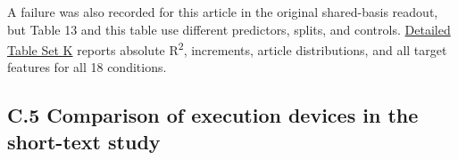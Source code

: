 A failure was also recorded for this article in the original shared-basis readout, but Table 13 and this table use different predictors, splits, and controls. \href{https://github.com/metaSATOKEN/manifold_topology_experiment/blob/main/references/tables/appendix_K.md}{Detailed Table Set K} reports absolute {R\textsuperscript{2},} increments, article distributions, and all target features for all 18 conditions.

\FloatBarrier

\clearpage

\subsection{C.5 Comparison of execution devices in the short-text study}\label{c.5-comparison-of-execution-devices-in-the-short-text-study}

